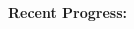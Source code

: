 \documentclass[12pt]{article}
\begin{document}
\begin{multicols}{2}
\raggedright

\paragraph{Recent Progress:}
\begin{comment}

		\itemsep0em 
		\item Added to global g and VTS:
		\begin{minipage}{\linewidth}
						\begin{itemize}
				\itemsep0em 
						\footnotesize
							\item ivmmod
							\item pwrmod
						\end{itemize}
				\end{minipage}
		\item\href{https://github.com/thadhaines/MT-Tech-SETO/blob/master/researchDocs/TEX/one-offs/200804-VTSexplained/200804-VTSexplained.pdf}{Updated VTS documentation}
		\item\href{https://github.com/thadhaines/MT-Tech-SETO/blob/master/researchDocs/TEX/one-offs/200806-ExtendedVersionComp/200806-ExtendedVersionComp.pdf}{Created 4 minute simulation showing VTS is $\approx$14x faster than PST 3.1.1}
		\item\href{https://github.com/thadhaines/MT-Tech-SETO/blob/master/researchDocs/TEX/one-offs/200806-ExtendedVTSdetail/200806-ExtendedVTSdetail.pdf}{Created a document showing possible VTS switching issues.}
		\item `Single Time Block' idea tested - not viable due to MATLAB solver operations.
		\item \href{https://github.com/thadhaines/MT-Tech-SETO/blob/master/researchDocs/TEX/one-offs/200709-PSTsetoVersionChanges/200709-PSTsetoVersionChanges.pdf}{Updated pst SETO change doc}
		\item \href{https://github.com/thadhaines/MT-Tech-SETO/blob/master/researchDocs/TEX/one-offs/200811-IVMwithVTS/200811-IVMwithVTS.pdf}{Tested IVM in VTS, created result doc.}


\paragraph{Action Items From Sandia:}
	\begin{itemize}
		\itemsep 0em 
			\item Run long term simulation to show benefits of VTS.
	\end{itemize}


\end{comment}
\end{multicols}
\end{document}
